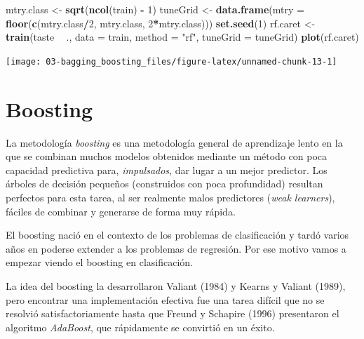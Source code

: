\documentclass[
]{book}
\newenvironment{Shaded}{\begin{snugshade}}{\end{snugshade}}
\newcommand{\DataTypeTok}[1]{\textcolor[rgb]{0.13,0.29,0.53}{#1}}
\newcommand{\DecValTok}[1]{\textcolor[rgb]{0.00,0.00,0.81}{#1}}
\newcommand{\KeywordTok}[1]{\textcolor[rgb]{0.13,0.29,0.53}{\textbf{#1}}}
\newcommand{\NormalTok}[1]{#1}
\newcommand{\OperatorTok}[1]{\textcolor[rgb]{0.81,0.36,0.00}{\textbf{#1}}}
\newcommand{\StringTok}[1]{\textcolor[rgb]{0.31,0.60,0.02}{#1}}
\theoremstyle{break}
\theoremstyle{definition}
\theoremstyle{definition}
\theoremstyle{definition}
\theoremstyle{remark}
\begin{document}
\begin{Shaded}
\begin{Highlighting}[]
\NormalTok{mtry.class <-}\StringTok{ }\KeywordTok{sqrt}\NormalTok{(}\KeywordTok{ncol}\NormalTok{(train) }\OperatorTok{-}\StringTok{ }\DecValTok{1}\NormalTok{)}
\NormalTok{tuneGrid <-}\StringTok{ }\KeywordTok{data.frame}\NormalTok{(}\DataTypeTok{mtry =} \KeywordTok{floor}\NormalTok{(}\KeywordTok{c}\NormalTok{(mtry.class}\OperatorTok{/}\DecValTok{2}\NormalTok{, mtry.class, }\DecValTok{2}\OperatorTok{*}\NormalTok{mtry.class)))}
\KeywordTok{set.seed}\NormalTok{(}\DecValTok{1}\NormalTok{)}
\NormalTok{rf.caret <-}\StringTok{ }\KeywordTok{train}\NormalTok{(taste }\OperatorTok{~}\StringTok{ }\NormalTok{., }\DataTypeTok{data =}\NormalTok{ train,}
                  \DataTypeTok{method =} \StringTok{"rf"}\NormalTok{, }\DataTypeTok{tuneGrid =}\NormalTok{ tuneGrid)}
\KeywordTok{plot}\NormalTok{(rf.caret)}
\end{Highlighting}
\end{Shaded}

\begin{center}\texttt{[image: 03-bagging\_boosting\_files/figure-latex/unnamed-chunk-13-1]} \end{center}

\hypertarget{boosting}{%
\section{Boosting}\label{boosting}}

La metodología \emph{boosting} es una metodología general de aprendizaje lento en la que se combinan muchos modelos obtenidos mediante un método con poca capacidad predictiva para, \emph{impulsados}, dar lugar a un mejor predictor. Los árboles de decisión pequeños (construidos con poca profundidad) resultan perfectos para esta tarea, al ser realmente malos predictores (\emph{weak learners}), fáciles de combinar y generarse de forma muy rápida.

El boosting nació en el contexto de los problemas de clasificación y tardó varios años en poderse extender a los problemas de regresión. Por ese motivo vamos a empezar viendo el boosting en clasificación.

La idea del boosting la desarrollaron Valiant (1984) y Kearns y Valiant (1989), pero encontrar una implementación efectiva fue una tarea difícil que no se resolvió satisfactoriamente hasta que Freund y Schapire (1996) presentaron el algoritmo \emph{AdaBoost}, que rápidamente se convirtió en un éxito.
\end{document}
